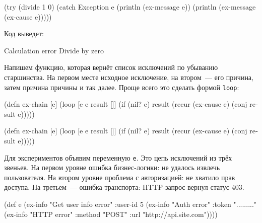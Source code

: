 \else

\begin{english}
  \begin{clojure}
(try
  (divide 1 0)
  (catch Exception e
    (println (ex-message e))
    (println (ex-message (ex-cause e)))))
  \end{clojure}
\end{english}

\fi

\noindent
Код выведет:

\begin{english}
  \begin{text}
Calculation error
Divide by zero
  \end{text}
\end{english}

Напишем функцию, которая вернёт список исключений по убыванию
старшинства. На первом месте исходное исключение, на втором~--- его причина, затем
причина причины и так далее. Проще всего это сделать формой \verb|loop|:


\ifnarrow

\begin{english}
  \begin{clojure}
(defn ex-chain [e]
  (loop [e e
         result []]
    (if (nil? e)
      result
      (recur (ex-cause e)
        (conj result e)))))
  \end{clojure}
\end{english}

\else

\begin{english}
  \begin{clojure}
(defn ex-chain [e]
  (loop [e e
         result []]
    (if (nil? e)
      result
      (recur (ex-cause e) (conj result e)))))
  \end{clojure}
\end{english}

\fi

Для экспериментов объявим переменную \verb|e|. Это цепь исключений из трёх
звеньев. На первом уровне ошибка бизнес-логики: не удалось извлечь
пользователя. На втором уровне проблема с авторизацией: не хватило прав
доступа. На третьем~--- ошибка транспорта: HTTP-запрос вернул статус 403.

\label{e-sample}

\ifnarrow

\begin{english}
  \begin{clojure}
(def e
  (ex-info
   "Get user info error"
   {:user-id 5}
   (ex-info
     "Auth error"
     {:token "........."}
     (ex-info
       "HTTP error"
       {:method "POST"
        :url "http://api.site.com"}))))
  \end{clojure}
\end{english}


